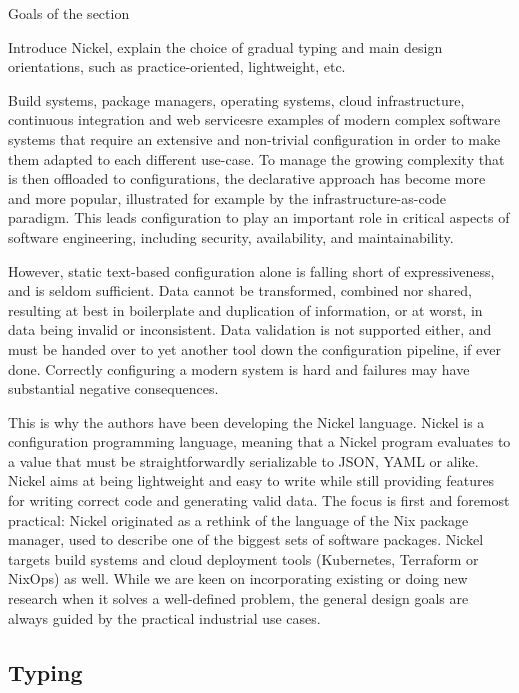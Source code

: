 \documentclass[sigplan,10pt,review,anonymous]{acmart}
\newcommand{\resolved}[2]{}
\begin{document}
{\color{red}Goals of the section

Introduce Nickel, explain the choice of gradual
typing and main design orientations, such as practice-oriented, lightweight,
etc.\vspace{0.5cm}}

Build systems, package managers, operating systems, cloud infrastructure,
continuous integration and web services\resolved{Also continuous integration}
are examples of modern complex software systems that require an extensive and
non-trivial configuration in order to make them adapted to each different
use-case. To manage the growing complexity that is then offloaded to
configurations, the declarative approach has become more and more popular,
illustrated for example by the infrastructure-as-code paradigm. This leads
configuration to play an important role in critical aspects of software
engineering, including security, availability, and maintainability.

However, static text-based configuration alone is falling short of
expressiveness, and is seldom sufficient. Data cannot be transformed, combined
nor shared, resulting at best in boilerplate and duplication of information, or
at worst, in data being invalid or inconsistent. Data validation is not
supported either, and must be handed over to yet another tool down the
configuration pipeline, if ever done. Correctly configuring a modern system is
hard and failures may have substantial negative consequences.

This is why the authors have been developing the Nickel
language\cite{NickelRepo}. Nickel is a configuration programming language,
meaning that a Nickel program evaluates to a value that must be
straightforwardly serializable to JSON, YAML or alike. Nickel aims at being
lightweight and easy to write while still providing features for writing correct
code and generating valid data. The focus is first and foremost practical:
Nickel originated as a rethink of the language of the Nix package manager, used
to describe one of the biggest sets of software packages\cite{repology}.  Nickel
targets build systems and cloud deployment tools (Kubernetes, Terraform or
NixOps) as well. While we are keen on incorporating existing or doing new
research when it solves a well-defined problem, the general design goals are
always guided by the practical industrial use cases.

\subsection{Typing}
\end{document}
